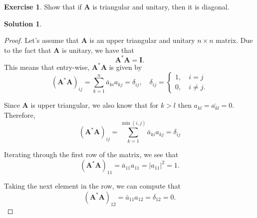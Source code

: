 \documentclass[12pt]{article}
\newcommand{\abs}[1]{ \left| #1 \right| }
\renewcommand{\vec}[1]{\mathbf{#1}}
\theoremstyle{definition}
\newtheorem{exer}{Exercise}
\newtheorem{sol}{Solution}
\theoremstyle{remark}
\begin{document}
\begin{exer}
    Show that if $\vec{A}$ is triangular and unitary, then it is diagonal.
\end{exer}

\begin{sol}\leavevmode

    \begin{proof}
Let's assume that $\vec{A}$ is an upper triangular and unitary $n\times n$ matrix. Due to the fact that $\vec{A}$ is unitary, we have that
\begin{equation}
    \vec{A}^*\vec{A} = \vec{I}.
\end{equation}
This means that entry-wise, $\vec{A}^*\vec{A}$ is given by
\begin{equation}
    (\vec{A}^*\vec{A})_{ij} = \sum_{k=1}^{n} \bar{a}_{ki}a_{kj}= \delta_{ij}, \quad \delta_{ij} = \begin{cases}
        1, \quad i = j \\
        0, \quad i \neq j.
    \end{cases}
\end{equation}

Since $\vec{A}$ is upper triangular, we also know that for $k>l$ then $a_{kl}=\bar{a_{kl}}=0$. Therefore,
\begin{equation}
    (\vec{A}^*\vec{A})_{ij} = \sum_{k=1}^{\min(i,j)} \bar{a}_{ki}a_{kj}= \delta_{ij}
\end{equation}

Iterating through the first row of the matrix, we see that
\begin{equation}
    (\vec{A}^*\vec{A})_{11} = \bar{a}_{11}a_{11} = \abs{a_{11}}^2 = 1.
\end{equation}

Taking the next element in the row, we can compute that
\begin{equation}
    (\vec{A}^*\vec{A})_{12} = \bar{a}_{11}a_{12} = \delta_{12} = 0.
\end{equation}


\end{proof}
\end{sol}
\end{document}
